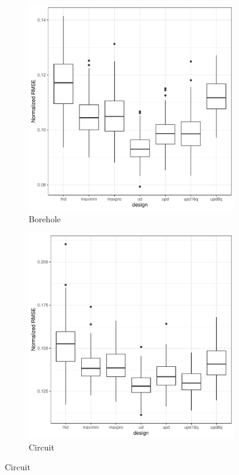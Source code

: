 \documentclass [PhD] {package/uclathes}
\begin{document}
\begin{figure}%
\begin{adjustwidth}{-2cm}{-2cm}
\captionsetup[subfigure]{labelformat=empty}
\centering
\begin{subfigure}[b]{0.35\textwidth}
\centering
\caption{Borehole}
\includegraphics[width=\textwidth]{chapters/EGO/pdfs/Borehole_64x15}
\end{subfigure}
\begin{subfigure}[b]{0.35\textwidth}
\centering
\caption{Circuit}
\includegraphics[width=\textwidth]{chapters/EGO/pdfs/Circuit_64x15}

\end{subfigure}
\end{adjustwidth}
\end{figure}
\end{document}
